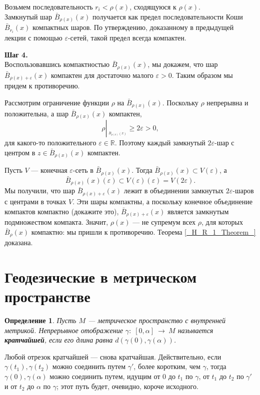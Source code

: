 \documentclass[12pt]{book}
\newcommand{\arrow}{{\:\longrightarrow\:}}
\newcommand{\restrict}[1]{{\left|_{{\phantom{|}\!\!}_{#1}}\right.}}
\def\endproof{\hbox{\vrule width 5pt height 5pt depth 0pt}}
\renewcommand{\epsilon}{\varepsilon}
\def\R{{\mathbb R}}
\theoremstyle{upshape}
\theoremstyle{generic}
\newtheorem{opredelenie}[teorema]{Определение}
\def\еза{\end{remark}}
\theoremstyle{upshapenonumber}
\newcommand{\следствие}{%
     \refstepcounter{teorema}
     {\noindent\bf Следствие \thechapter.\arabic{teorema}:\ }}
\newcommand{\пример}{%
     \refstepcounter{teorema}
     {\noindent\bf Пример \thechapter.\arabic{teorema}:\ }}
\newcommand{\лемма}{%
     \refstepcounter{teorema}
     {\noindent\bf Лемма \thechapter.\arabic{teorema}:\ }}
\newcommand{\теорема}{%
     \refstepcounter{teorema}
     {\noindent\bf Теорема \thechapter.\arabic{teorema}:\ }}
\newcommand{\утверждение}{%
     \refstepcounter{teorema}
     {\noindent\bf Утверждение \thechapter.\arabic{teorema}:\ }}
\def\хфилл{\hfill}
\def\ноиндент{\noindent}
\def\бф{\bf}
\def\ем{\em}
\def\ез{\end{zadacha}}
\def\еу{\end{ukazanie}}
\def\определение{\begin{opredelenie}}
\def\ео{\end{opredelenie}}
\def\енум{\begin{enumerate}}
\def\ее{\end{enumerate}}
\begin{document}
Возьмем последовательность $r_i< \rho(x)$, сходящуюся к $\rho(x)$.\\
Замкнутый шар $\bar B_{\rho(x)}(x)$ получается
как предел последовательности Коши $\bar B_{r_i}(x)$
компактных шаров. По утверждению, доказанному
в предыдущей лекции с помощью $\epsilon$-сетей,
такой предел всегда компактен. 

\хфилл

\ноиндент
{\бф Шаг 4.}\\
Воспользовавшись компактностью $\bar B_{\rho(x)}(x)$,
мы докажем, что шар \\$\bar B_{\rho(x)+\epsilon}(x)$
компактен для достаточно малого $\epsilon >0$.
Таким образом мы придем к противоречию.

Рассмотрим ограничение функции $\rho$ на 
$\bar B_{\rho(x)}(x)$. Поскольку $\rho$
непрерывна и положительна, а шар $\bar B_{\rho(x)}(x)$
компактен, \[ \rho\restrict {\bar B_{\rho(x)}(x)} \geq 2\epsilon >0,\]
для какого-то положительного $\epsilon\in \R$.
Поэтому каждый замкнутый $2\epsilon$-шар с центром в 
$z\in \bar B_{\rho(x)}(x)$ компактен.

Пусть $V$ --- конечная $\epsilon$-сеть в 
$\bar B_{\rho(x)}(x)$. Тогда 
$\bar B_{\rho(x)}(x)\subset V(\epsilon)$, а
\[
\bar B_{\rho(x)}(x)(\epsilon) \subset
V(\epsilon)(\epsilon)= V(2\epsilon).
\]
Мы получили, что шар $\bar B_{\rho(x)+\epsilon}(x)$
лежит в объединении замкнутых $2\epsilon$-шаров с 
центрами в точках $V$. Эти шары компактны, а 
поскольку конечное объединение компактов компактно (докажите это),
$\bar B_{\rho(x)+\epsilon}(x)$ является замкнутым подмножеством
компакта. Значит, $\rho(x)$ --- не супремум всех 
$\rho$, для которых $\bar B_\rho(x)$ компактно:
мы пришли к противоречию. Теорема \ref{_H_R_1_Theorem_}
доказана. \endproof




\section{Геодезические в метрическом пространстве}



\определение
Пусть $M$ --- метрическое пространство с внутренней
метрикой. Непрерывное отображение $\gamma:\; [0,\alpha]\arrow M$
называется {\бф кратчайшей}, если его длина равна 
$d(\gamma(0), \gamma(\alpha))$. 
\ео


Любой отрезок кратчайшей --- снова кратчайшая.
Действительно, если $\gamma(t_1), \gamma(t_2)$
можно соединить путем $\gamma'$, более коротким, чем
$\gamma$, тогда $\gamma(0), \gamma(\alpha)$
можно соединить путем, идущим от 0 до $t_1$
по $\gamma$, от $t_1$ до $t_2$ по $\gamma'$
и от $t_2$ до $\alpha$ по $\gamma$; этот путь
будет, очевидно, короче исходного.
\end{document}
